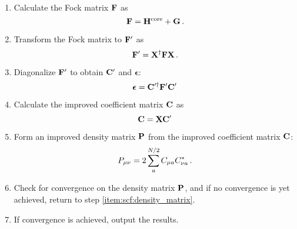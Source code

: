 \documentclass[12pt]{article}
\begin{document}
\begin{enumerate}
        \item Calculate the Fock matrix $\vb{F}$ as
        \begin{equation}
            \vb{F} = \vb{H}^\text{core} + \vb{G} \thinspace .
        \end{equation}

        \item Transform the Fock matrix to $\vb{F}'$ as
        \begin{equation}
            \vb{F}' = \vb{X}^\dagger \vb{F} \vb{X} \thinspace .
        \end{equation}

        \item Diagonalize $\vb{F}'$ to obtain $\vb{C}'$ and $\boldsymbol{\epsilon}$:
        \begin{equation}
            \boldsymbol{\epsilon} = \vb{C}'^\dagger \vb{F}' \vb{C}'
        \end{equation}

        \item Calculate the improved coefficient matrix $\vb{C}$ as
        \begin{equation}
            \vb{C} = \vb{X} \vb{C}'
        \end{equation}

        \item Form an improved density matrix $\vb{P}$ from the improved coefficient matrix $\vb{C}$:
        \begin{equation}
            P_{\mu \nu} = 2 \sum_a^{N/2} C_{\mu a} C^*_{\nu a} \thinspace .
        \end{equation}

        \item Check for convergence on the density matrix $\vb{P}$, and if no convergence is yet achieved, return to step \ref{item:scf:density_matrix}.

        \item If convergence is achieved, output the results.
    \end{enumerate}






\end{document}
